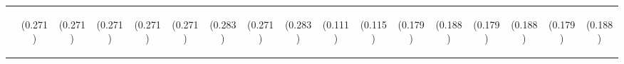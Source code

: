 \begin{center}
\begin{tabular}{lcccccccccccccccc}
 & \begin{footnotesize}(0.271)\end{footnotesize} & \begin{footnotesize}(0.271)\end{footnotesize} & \begin{footnotesize}(0.271)\end{footnotesize} & \begin{footnotesize}(0.271)\end{footnotesize} & \begin{footnotesize}(0.271)\end{footnotesize} & \begin{footnotesize}(0.283)\end{footnotesize} & \begin{footnotesize}(0.271)\end{footnotesize} & \begin{footnotesize}(0.283)\end{footnotesize} & \begin{footnotesize}(0.111)\end{footnotesize} & \begin{footnotesize}(0.115)\end{footnotesize} & \begin{footnotesize}(0.179)\end{footnotesize} & \begin{footnotesize}(0.188)\end{footnotesize} & \begin{footnotesize}(0.179)\end{footnotesize} & \begin{footnotesize}(0.188)\end{footnotesize} & \begin{footnotesize}(0.179)\end{footnotesize} & \begin{footnotesize}(0.188)\end{footnotesize} \\

\end{tabular}
\end{center}
